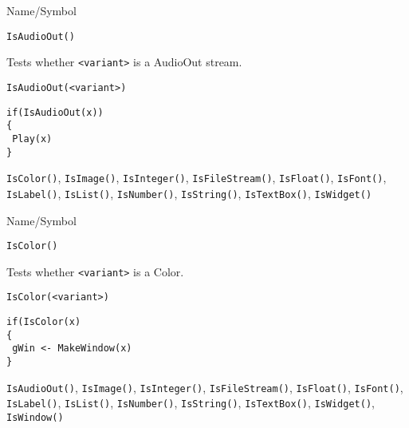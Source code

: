 \rl


\begin{desc}{Name/Symbol}
\item[Name/Symbol]	\verb+IsAudioOut()+

\item[Description]	Tests whether \verb+<variant>+ is a AudioOut stream.

\item[Usage]
\begin{verbatim}
IsAudioOut(<variant>)
\end{verbatim}

\item[Example]
\begin{verbatim}
if(IsAudioOut(x))
{
 Play(x)
}
\end{verbatim}

\item[See Also] \verb+IsColor()+, \verb+IsImage()+,
  \verb+IsInteger()+, \verb+IsFileStream()+, \verb+IsFloat()+,
  \verb+IsFont()+, \verb+IsLabel()+, \verb+IsList()+,
  \verb+IsNumber()+, \verb+IsString()+, \verb+IsTextBox()+,
  \verb+IsWidget()+
\end{desc}

\rl


\begin{desc}{Name/Symbol}
\item[Name/Symbol]	\verb+IsColor()+

\item[Description]	Tests whether \verb+<variant>+ is a Color.

\item[Usage]
\begin{verbatim}
IsColor(<variant>)
\end{verbatim}

\item[Example]
\begin{verbatim}
if(IsColor(x)
{
 gWin <- MakeWindow(x)
}
\end{verbatim}

\item[See Also] \verb+IsAudioOut()+, \verb+IsImage()+,
  \verb+IsInteger()+, \verb+IsFileStream()+, \verb+IsFloat()+,
  \verb+IsFont()+, \verb+IsLabel()+, \verb+IsList()+,
  \verb+IsNumber()+, \verb+IsString()+, \verb+IsTextBox()+,
  \verb+IsWidget()+, \verb+IsWindow()+
\end{desc}

\rl




